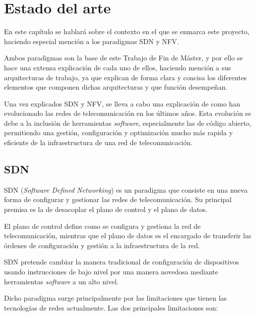 \chapter{Estado del arte}
En este capítulo se hablará sobre el contexto en el que se enmarca este proyecto, haciendo especial mención a los paradigmas SDN y NFV.

Ambos paradigmas son la base de este Trabajo de Fin de Máster, y por ello se hace una extensa explicación de cada uno de ellos, haciendo mención a sus arquitecturas de trabajo, ya que explican de forma clara y concisa los diferentes elementos que componen dichas arquitecturas y que función desempeñan.

Una vez explicados SDN y NFV, se lleva a cabo una explicación de como han evolucionado las redes de telecomunicación en los últimos años. Esta evolución se debe a la inclusión de herramientas \textit{software}, especialmente las de código abierto, permitiendo una gestión, configuración y optimización mucho más rapida y eficiente de la infraestructura de una red de telecomunicación.

\section{SDN}
\label{sec:sdn}

SDN (\textit{Software Defined Networking})\cite{sdnbib} es un paradigma que consiste en una nueva forma de configurar y gestionar las redes de telecomunicación. Su principal premisa es la de desacoplar el plano de control y el plano de datos.

El plano de control define como se configura y gestiona la red de telecomunicación, mientras que el plano de datos es el encargado de transferir las órdenes de configuración y gestión a la infraestructura de la red.

SDN pretende cambiar la manera tradicional de configuración de dispositivos usando instrucciones de bajo nivel por una manera novedosa mediante herramientas \textit{software} a un alto nivel.

Dicho paradigma surge principalmente por las limitaciones que tienen las tecnologías de redes actualmente. Las dos principales limitaciones son:

